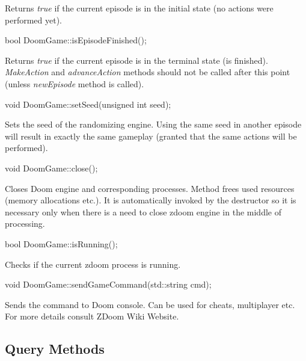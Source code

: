\documentclass[english,bachelor,a4paper,twoside]{ppfcmthesis}
\begin{document}
	Returns \emph{true} if the current episode is in the initial state (no actions were performed yet).


\vspace{20pt}
\begin{clinee}
	bool DoomGame::isEpisodeFinished();
\end{clinee}

	Returns \emph{true} if the current episode is in the terminal state (is finished). \emph{MakeAction} and \emph{advanceAction} methods should not be called after this point (unless \emph{newEpisode} method is called).


\vspace{20pt}
\begin{clinee}
	void DoomGame::setSeed(unsigned int seed);
\end{clinee}

	Sets the seed of the randomizing engine. Using the same seed in another episode will result in exactly the same gameplay (granted that the same actions will be performed).


\vspace{20pt}
\begin{clinee}
	void DoomGame::close();
\end{clinee}

	Closes Doom engine and corresponding processes. Method frees used resources (memory allocations etc.). It is automatically invoked by the destructor so it is necessary only when there is a need to close zdoom engine in the middle of processing.


\vspace{20pt}
\begin{clinee}
	bool DoomGame::isRunning();
\end{clinee}
	
	Checks if the current zdoom process is running.


\vspace{20pt}
\begin{clinee}
	void DoomGame::sendGameCommand(std::string cmd);
\end{clinee}

	Sends the command to Doom console. Can be used for cheats, multiplayer etc. For more details consult ZDoom Wiki Website\cite{zdoom-wiki}.


\vspace{20pt}
\subsection{Query Methods}
\end{document}
